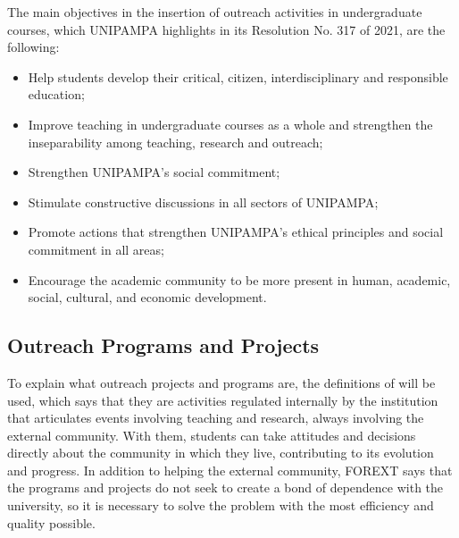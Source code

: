 The main objectives in the insertion of outreach activities in undergraduate courses, which \ac{UNIPAMPA} highlights in its Resolution No. 317 of 2021, \cite{res317} are the following:
\begin{itemize}
  \item Help students develop their critical, citizen, interdisciplinary and responsible education;
  \item Improve teaching in undergraduate courses as a whole and strengthen the inseparability among teaching, research and outreach;
  \item Strengthen \ac{UNIPAMPA}'s social commitment;
  \item Stimulate constructive discussions in all sectors of \ac{UNIPAMPA}; 
  \item Promote actions that strengthen \ac{UNIPAMPA}'s ethical principles and social commitment in all areas;
  \item Encourage the academic community to be more present in human, academic, social, cultural, and economic development.
\end{itemize}

\subsection{Outreach Programs and Projects}\label{sec:3.2.1}


To explain what outreach projects and programs are, the definitions of \textcite{referenciaisPolitica} will be used, which says that they are activities regulated internally by the institution that articulates events involving teaching and research, always involving the external community.
With them, students can take attitudes and decisions directly about the community in which they live, contributing to its evolution and progress.
In addition to helping the external community, \ac{FOREXT} says that the programs and projects do not seek to create a bond of dependence with the university, so it is necessary to solve the problem with the most efficiency and quality possible.

